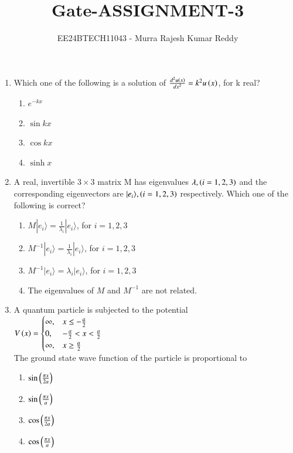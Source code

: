 \documentclass[journal,12pt,onecolumn,article]{IEEEtran}
\theoremstyle{remark}
\begin{document}

\vspace{3cm}
\title{Gate-ASSIGNMENT-3}
\author{EE24BTECH11043 - Murra Rajesh Kumar Reddy}
\maketitle
\bigskip
\begin{enumerate}
	\item Which one of the following is a solution of $\frac{d^2 u\left(x\right)}{dx^2}=k^2u\left(x\right)$, for k real?
		\begin{enumerate}
			\item $e^{-kx}$
			\item $\sin {kx}$
			\item $\cos {kx}$
			\item $\sinh {x}$
		\end{enumerate}
	\item A real, invertible $3\times 3$ matrix M has eigenvalues $\lambda,\left(i=1,2,3\right)$ and the corresponding eigenvectors are $|e_i\rangle , \left(i=1,2,3\right)$ respectively. Which one of the following is correct?
		\begin{enumerate}
			\item $M |e_i \rangle = \frac{1}{\lambda_i}|e_i\rangle$, for $i=1,2,3$
			\item $M^{-1}|e_i \rangle = \frac{1}{\lambda_i}|e_i\rangle$, for $i=1,2,3$
			\item $M^{-1}|e_i \rangle = \lambda_i|e_i\rangle$, for $i=1,2,3$
			\item The eigenvalues of $M$ and $M^{-1}$ are not related.
		\end{enumerate}
	\item A quantum particle is subjected to the potential \\
		$ V\left(x\right) =
		\begin{cases}
			\infty, & x\le -\frac{a}{2} \\
			0, & -\frac{a}{2} < x < \frac{a}{2} \\
			\infty, & x\ge \frac{a}{2}
		\end{cases}$ \\
		The ground state wave function of the particle is proportional to
		\begin{enumerate}
			\item $\sin{\ensuremath{\left(\frac{\pi x}{2a}\right)}}$
			\item $\sin{\ensuremath{\left(\frac{\pi x}{a}\right)}}$
			\item $\cos{\ensuremath{\left(\frac{\pi x}{2a}\right)}}$
			\item $\cos{\ensuremath{\left(\frac{\pi x}{a}\right)}}$

\end{enumerate}
\end{enumerate}
\end{document}
